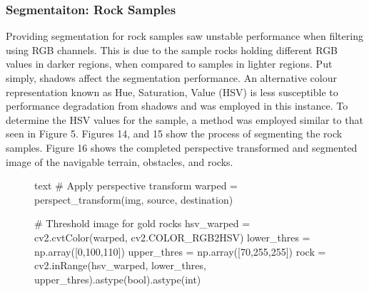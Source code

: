 \documentclass[a4paper]{article}
\begin{document}
\clearpage

\subsubsection{Segmentaiton: Rock Samples}

Providing segmentation for rock samples saw unstable performance when filtering using RGB channels. This is due to the sample rocks holding different RGB values in darker regions, when compared to samples in lighter regions. Put simply, shadows affect the segmentation performance. An alternative colour representation known as Hue, Saturation, Value (HSV) is less susceptible to performance degradation from shadows and was employed in this instance. To determine the HSV values for the sample, a method was employed similar to that seen in Figure 5. Figures 14, and 15 show the process of segmenting the rock samples. Figure 16 shows the completed perspective transformed and segmented image of the navigable terrain, obstacles, and rocks.

\vspace{1cm}

\begin{figure}[h]\scriptsize
\centering
\begin{sexylisting}{text}
# Apply perspective transform
warped = perspect_transform(img, source, destination)

# Threshold image for gold rocks
hsv_warped = cv2.cvtColor(warped, cv2.COLOR_RGB2HSV)
lower_thres = np.array([0,100,110])
upper_thres = np.array([70,255,255])
rock = cv2.inRange(hsv_warped, lower_thres, upper_thres).astype(bool).astype(int)
\end{sexylisting}
\end{figure}

\vspace{-0.5cm}
\end{document}
